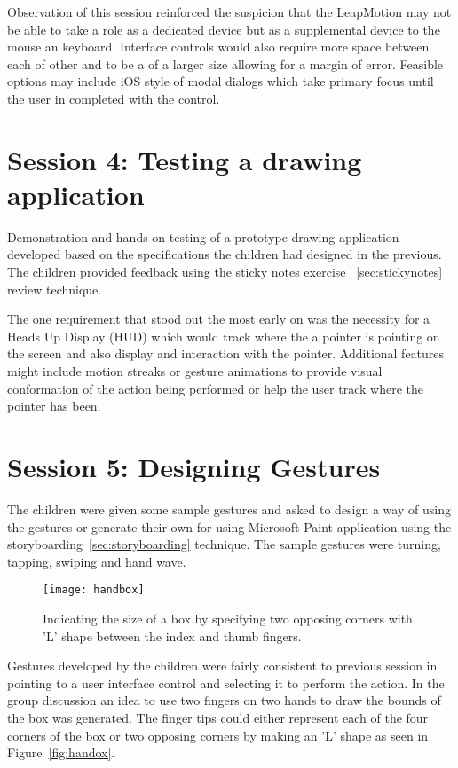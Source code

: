 Observation of this session reinforced the suspicion that the LeapMotion may not be able to take a role as a dedicated device but as a supplemental device to the mouse an keyboard. Interface controls would also require more space between each of other and to be a of a larger size allowing for a margin of error. Feasible options may include iOS style of modal dialogs which take primary focus until the user in completed with the control. 

\section{Session 4: Testing a drawing application}\label{session4}

Demonstration and hands on testing of a prototype drawing application developed based on the specifications the children had designed in the previous. The children provided feedback using the sticky notes exercise ~\ref{sec:stickynotes} review technique. 

The one requirement that stood out the most early on was the necessity for a Heads Up Display (HUD) which would track where the a pointer is pointing on the screen and also display and interaction with the pointer. Additional features might include motion streaks or gesture animations to provide visual conformation of the action being performed or help the user track where the pointer has been. 



\section{Session 5: Designing Gestures }\label{session5}

The children were given some sample gestures and asked to design a way of using the gestures or generate their own for using Microsoft Paint application using the storyboarding~\ref{sec:storyboarding} technique. The sample gestures were turning, tapping, swiping and hand wave. 
\begin{figure}
\centering
\texttt{[image: handbox]}
\caption{Indicating the size of a box by specifying two opposing corners with 'L' shape between the index and thumb fingers.}
\label{fig:handbox}
\end{figure}
Gestures developed by the children were fairly consistent to previous session in pointing to a user interface control and selecting it to perform the action. In the group discussion an idea to use two fingers on two hands to draw the bounds of the box was generated. The finger tips could either represent each of the four corners of the box or two opposing corners by making an 'L' shape as seen in Figure~\ref{fig:handox}. 

